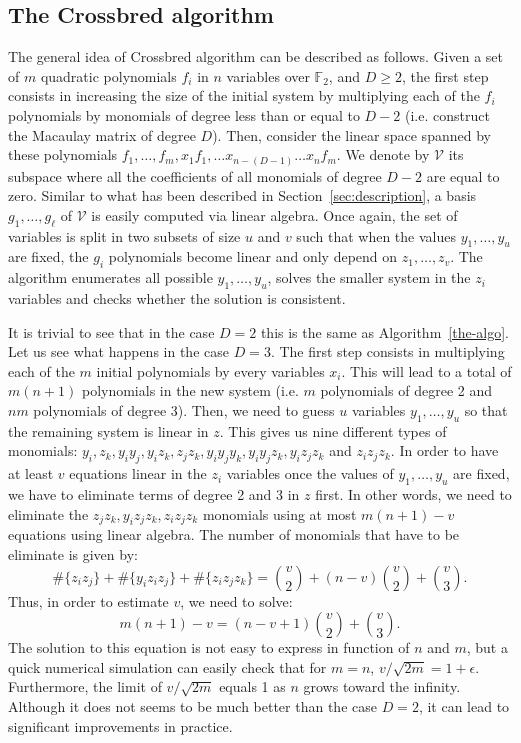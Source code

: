 \documentclass[a4paper,UKenglish,cleveref, autoref]{lipics-v2019}
\begin{document}
\subsection{The \textsf{Crossbred} algorithm}\label{sec:JV}

The general idea of \textsf{Crossbred} algorithm can be described as follows.
Given a set of $m$ quadratic polynomials $f_i$ in $n$ variables over $\mathbb{F}_2$, 
and $D \geq 2$, the first step consists in
increasing the size of the initial system by multiplying each of the $f_i$
polynomials by monomials of degree less than or equal to $D-2$ 
(i.e. construct the Macaulay matrix of degree $D$).
Then, consider the linear space spanned 
by these polynomials $f_1, \dots, f_m, x_1f_1, \dots x_{n-(D-1)}\dots x_{n}f_m$. 
We denote by $\mathcal{V}$ its subspace where all the coefficients of all 
monomials of degree $D -2$ are equal to zero. Similar to what has been 
described in Section~\ref{sec:description}, a basis $g_1, \dots, g_\ell$ of
$\mathcal{V}$ is easily computed via linear algebra. Once again, the set of variables
is split in two subsets of size $u$ and $v$ such that when the values $y_1, \dots, y_u$
are fixed, the $g_i$ polynomials become linear and only depend on $z_1, \dots, z_v$.
The algorithm enumerates all possible $y_1, \dots, y_u$, solves the smaller system in the $z_i$
variables and checks whether the solution is consistent.

It is trivial to see that in the case $D=2$ this is the same as Algorithm~\ref{the-algo}.
Let us see what happens in the case $D=3$. The first step consists in multiplying each of
the $m$ initial polynomials by every variables $x_i$. This will lead to a total of
$m(n+1)$ polynomials in the new system (i.e. $m$ polynomials of degree 2 and $nm$ polynomials
of degree 3). Then, we need to guess $u$ variables $y_1, \dots, y_u$ so that the remaining system
is linear in $z$. This gives us nine different types of monomials:
$y_i, z_k, y_iy_j, y_iz_k, z_jz_k, y_iy_jy_k, y_iy_jz_k, y_iz_jz_k$ and $z_iz_jz_k$.
In order to have at least $v$ equations linear in the $z_i$ variables once the values of $y_1, \dots, y_u$
are fixed, we have to eliminate terms of degree 2 and 3 in $z$ first. In other words,
we need to eliminate the $z_jz_k, y_iz_jz_k, z_iz_jz_k$ monomials using at most $m(n+1) - v$ equations
using linear algebra. The number of monomials that have to be eliminate is given by:
\[
  \#\{z_iz_j\} + \#\{y_iz_iz_j\} +\#\{z_iz_jz_k\}
 = \binom{v}{2} + (n-v)\binom{v}{2} +\binom{v}{3}.
\]
Thus, in order to estimate $v$, we need to solve:
\[
 m(n+1) -v = (n-v +1)\binom{v}{2} + \binom{v}{3}.
\]
The solution to this equation is not easy to express in function of $n$ and $m$, but a quick
numerical simulation can easily check that for $m=n$, $v/\sqrt{2m} = 1+\epsilon$. Furthermore,
the limit of $v/\sqrt{2m}$ equals 1 as $n$ grows toward the infinity. Although it does not seems
to be much better than the case $D=2$, it can lead to significant improvements in
practice.
\end{document}
